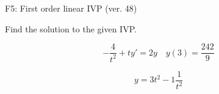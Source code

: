 \begin{exercise}
  \begin{exerciseTitle}F5: First order linear IVP (ver. 48)\end{exerciseTitle}
  \begin{exerciseStatement}
    
Find the solution to the given IVP.

    
\[-\frac{4}{t^{2}} +ty'= 2 y \hspace{1em} y( 3 ) = \frac{242}{9}\]

  \end{exerciseStatement}
  \begin{exerciseAnswer}
    
\[y= 3 t^ 2 -1 \frac{1}{t^{2}}\]

  \end{exerciseAnswer}
\end{exercise}